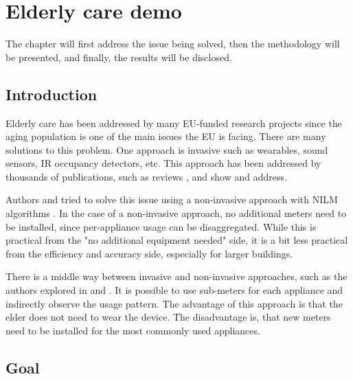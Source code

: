 \chapter{Elderly care demo} %

\label{chapter6} %

The chapter will first address the issue being solved,
then the methodology will be presented, and finally,
the results will be disclosed.

\section{Introduction}


Elderly care has been addressed by many EU-funded research projects since the aging population is one of the main issues the EU is facing. 
There are many solutions to this problem.
One approach is invasive such as wearables, sound sensors, IR occupancy detectors, etc. 
This approach has been addressed by thousands of publications, such as reviews \cite{elderReview1}, \cite{elderReview2} and \cite{elderReview3} show and address.

Authors \cite{elderNILM} and \cite{elderNILMDementia} tried to solve this issue using a non-invasive approach with NILM algorithms . 
In the case of a non-invasive approach, no additional meters need to be installed, since per-appliance usage can be disaggregated.
While this is practical from the "no additional equipment needed" side, it is a bit less practical from the efficiency and accuracy side, especially for larger buildings. 

There is a middle way between invasive and non-invasive approaches, such as the authors explored in \cite{elder1} and \cite{elder2}. 
It is possible to use sub-meters for each appliance and indirectly observe the usage pattern. 
The advantage of this approach is that the elder does not need to wear the device.
The disadvantage is, that new meters need to be installed for the most commonly used appliances.

\section{Goal}

